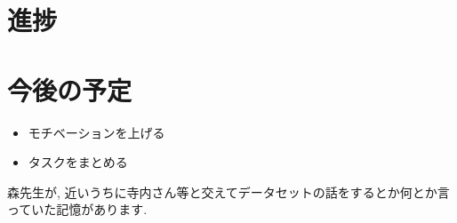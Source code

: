 \documentclass[twocolumn]{jarticle}     %
\begin{document}

\section{進捗}


\section{今後の予定}
\begin{itemize}
  \item モチベーションを上げる
  \item タスクをまとめる
\end{itemize}

森先生が, 近いうちに寺内さん等と交えてデータセットの話をするとか何とか言っていた記憶があります.
\end{document}
